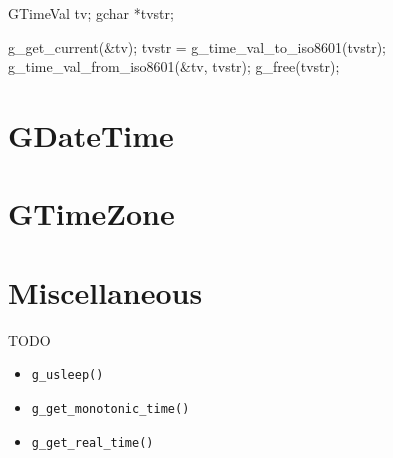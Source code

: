 \begin{code}{}
GTimeVal tv;
gchar *tvstr;

g_get_current(&tv);
tvstr = g_time_val_to_iso8601(tvstr);
g_time_val_from_iso8601(&tv, tvstr);
g_free(tvstr);
\end{code}


\section{GDateTime}



\section{GTimeZone}


\section{Miscellaneous}

TODO

\begin{itemize}
\item \verb|g_usleep()|
\item \verb|g_get_monotonic_time()|
\item \verb|g_get_real_time()|
\end{itemize}
